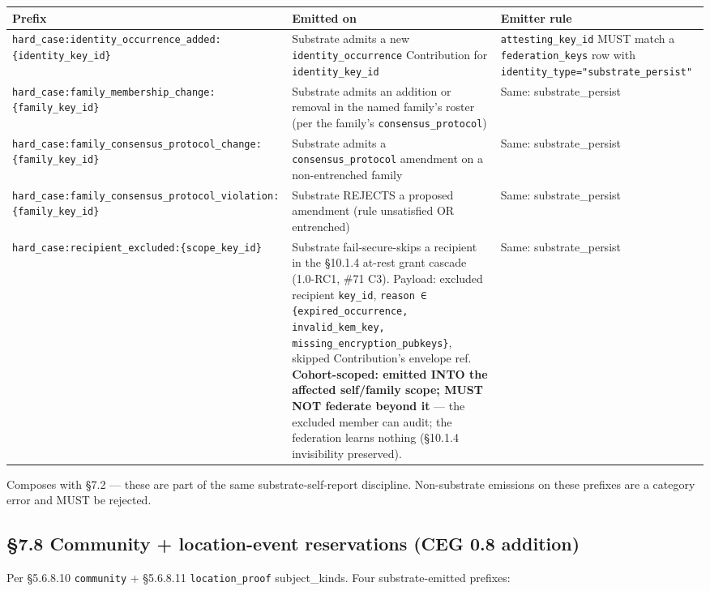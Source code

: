 \documentclass[11pt]{article}
\begin{document}
{\footnotesize
\begin{longtable}{|p{5.33cm}|p{5.33cm}|p{5.33cm}|}\hline
\textbf{Prefix} & \textbf{Emitted on} & \textbf{Emitter rule} \\ \hline\endhead
\texttt{hard\_case:identity\_occurrence\_added:\{identity\_key\_id\}} & Substrate admits a new \texttt{identity\_occurrence} Contribution for \texttt{identity\_key\_id} & \texttt{attesting\_key\_id} MUST match a \texttt{federation\_keys} row with \texttt{identity\_type="substrate\_persist"} \\ \hline
\texttt{hard\_case:family\_membership\_change:\{family\_key\_id\}} & Substrate admits an addition or removal in the named family's roster (per the family's \texttt{consensus\_protocol}) & Same: substrate\_persist \\ \hline
\texttt{hard\_case:family\_consensus\_protocol\_change:\{family\_key\_id\}} & Substrate admits a \texttt{consensus\_protocol} amendment on a non-entrenched family & Same: substrate\_persist \\ \hline
\texttt{hard\_case:family\_consensus\_protocol\_violation:\{family\_key\_id\}} & Substrate REJECTS a proposed amendment (rule unsatisfied OR entrenched) & Same: substrate\_persist \\ \hline
\texttt{hard\_case:recipient\_excluded:\{scope\_key\_id\}} & Substrate fail-secure-skips a recipient in the §10.1.4 at-rest grant cascade (1.0-RC1, \#71 C3). Payload: excluded recipient \texttt{key\_id}, \texttt{reason ∈ \{expired\_occurrence, invalid\_kem\_key, missing\_encryption\_pubkeys\}}, skipped Contribution's envelope ref. \textbf{Cohort-scoped: emitted INTO the affected self/family scope; MUST NOT federate beyond it} — the excluded member can audit; the federation learns nothing (§10.1.4 invisibility preserved). & Same: substrate\_persist \\ \hline
\end{longtable}}


Composes with §7.2 — these are part of the same substrate-self-report discipline. Non-substrate emissions on these prefixes are a category error and MUST be rejected.


\subsection*{§7.8 Community + location-event reservations (CEG 0.8 addition)}


Per §5.6.8.10 \texttt{community} + §5.6.8.11 \texttt{location\_proof} subject\_kinds. Four substrate-emitted prefixes:
\end{document}
